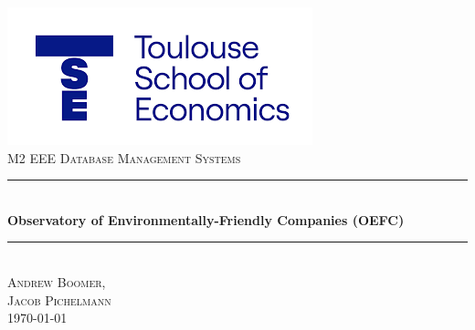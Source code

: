 


\begin{titlepage}

\newcommand{\HRule}{\rule{\linewidth}{0.25mm}} %
\setlength{\topmargin}{-0.5in}
\center %

\includegraphics[scale=0.75]{TSE.png}\\

\large \textsc{M2 EEE Database Management Systems}
\vspace{1.5cm}
\textsc{\large } %


\HRule \\[0.75cm]
{ \huge \bfseries Observatory of Environmentally-Friendly Companies (OEFC)}\\[0.5cm] %
\HRule \\[1.75cm]


\large\textsc{Andrew Boomer, \\ Jacob Pichelmann} \\[1.5cm]


{\large \today}\\[0.5cm] %

\vfill %

\end{titlepage}

